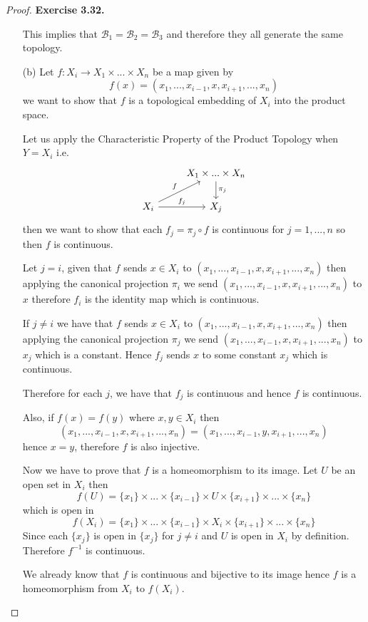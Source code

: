 \documentclass[11pt]{article}
\theoremstyle{definition}
\begin{document}
\begin{proof}{\textbf{Exercise 3.32.}}
\begin{itemize}
    This implies that $\mathcal{B}_1 = \mathcal{B}_2 = \mathcal{B}_3$ and
    therefore they all generate the same topology.
\cleardoublepage
    \item [(b)] Let $f: X_i \to X_1 \times ... \times X_n$ be a map
    given by $$f(x) = (x_1, ..., x_{i-1}, x, x_{i+1}, ..., x_n)$$
    we want to show that $f$ is a topological embedding of $X_i$ into
    the product space.

    Let us apply the Characteristic Property of the Product Topology when
    $Y = X_i$ i.e.
    \[\begin{tikzcd}
        & X_1 \times ... \times X_n \arrow[d,"\pi_j"] \\
        X_i \arrow[ur,"f"]\arrow[r,"f_j"] & X_j
    \end{tikzcd}\]
    then we want to show that each
    $f_j = \pi_j \circ f$ is continuous  for $j = 1,..., n$
    so then $f$ is continuous.
    
    Let $j = i$, given that $f$ sends $x \in X_i$ to
    $(x_1, ..., x_{i-1}, x, x_{i+1}, ..., x_n)$
    then applying the canonical projection $\pi_i$ we send
    $(x_1, ..., x_{i-1}, x, x_{i+1}, ..., x_n)$ to $x$ therefore $f_i$
    is the identity map which is continuous.

    If $j \neq i$ we have that $f$ sends $x \in X_i$ to
    $(x_1, ..., x_{i-1}, x, x_{i+1}, ..., x_n)$
    then applying the canonical projection $\pi_j$ we send
    $(x_1, ..., x_{i-1}, x, x_{i+1}, ..., x_n)$ to $x_j$ which is a constant.
    Hence $f_j$ sends $x$ to some constant $x_j$ which is continuous.

    Therefore for each $j$, we have that $f_j$ is continuous
    and hence $f$ is continuous. 

    Also, if $f(x) = f(y)$ where $x, y \in X_i$ then
    $$(x_1, ..., x_{i-1}, x, x_{i+1}, ..., x_n)
    = (x_1, ..., x_{i-1}, y, x_{i+1}, ..., x_n)$$
    hence $x = y$, therefore $f$ is also injective.

    Now we have to prove that $f$ is a homeomorphism to its image.
    Let $U$ be an open set in $X_i$ then
    $$f(U) = \{x_1\} \times ... \times \{x_{i-1}\} \times U
    \times \{x_{i+1}\} \times ... \times \{x_n\}$$
    which is open in
    $$f(X_i) = \{x_1\} \times ... \times \{x_{i-1}\} \times X_i
    \times \{x_{i+1}\} \times ... \times \{x_n\}$$
    Since each $\{x_j\}$ is open in $\{x_j\}$ for $j \neq i$ and $U$ is open
    in $X_i$ by definition. Therefore $f^{-1}$ is continuous.

    We already know that $f$ is continuous and bijective
    to its image hence $f$ is a homeomorphism from $X_i$ to $f(X_i)$. 


\end{itemize}
\end{proof}
\end{document}
